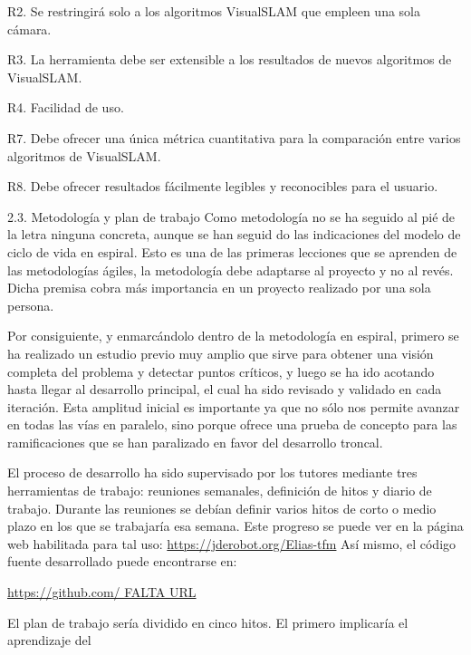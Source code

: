 	R2. Se restringirá solo a los algoritmos VisualSLAM que empleen una sola cámara.

	R3. La herramienta debe ser extensible a los resultados de nuevos algoritmos de VisualSLAM.

	R4. Facilidad de uso.

	R7. Debe ofrecer una única métrica cuantitativa para la comparación entre varios algoritmos de VisualSLAM.

	R8. Debe ofrecer resultados fácilmente legibles y reconocibles para el usuario.

2.3. Metodología y plan de trabajo
Como metodología no se ha seguido al pié de la letra ninguna concreta, aunque se han seguid do las indicaciones del modelo de ciclo de vida en espiral. Esto es una de las primeras lecciones que se aprenden de las metodologías ágiles, la metodología debe adaptarse al proyecto y no al revés. Dicha premisa cobra más importancia en un proyecto realizado por una sola persona.

Por consiguiente, y enmarcándolo dentro de la metodología en espiral, primero se ha realizado un estudio previo muy amplio que sirve para obtener una visión completa del problema y detectar puntos críticos, y luego se ha ido acotando hasta llegar al desarrollo principal, el cual ha sido revisado y validado en cada iteración. Esta amplitud inicial es importante ya que no sólo nos permite avanzar en todas las vías en paralelo, sino porque ofrece una prueba de concepto para las ramificaciones que se han paralizado en favor del desarrollo troncal.

El proceso de desarrollo ha sido supervisado por los tutores mediante tres herramientas de trabajo: reuniones semanales, definición de hitos y diario de trabajo.
Durante las reuniones se debían definir varios hitos de corto o medio plazo en los que se trabajaría esa semana. Este progreso se puede ver en la página web habilitada para tal uso:
\url{https://jderobot.org/Elias-tfm}
Así mismo, el código fuente desarrollado puede encontrarse en:

\url{https://github.com/ FALTA URL}

El plan de trabajo sería dividido en cinco hitos. El primero implicaría el aprendizaje del

